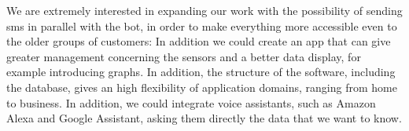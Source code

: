 We are extremely interested in expanding our work with the possibility of sending sms in parallel with the bot, in order to make everything more accessible even to the older groups of customers: In addition we could create an app that can give greater management concerning the sensors and a better data display, for example introducing graphs. In addition, the structure of the software, including the database, gives an high flexibility of application domains, ranging from home to business. In addition, we could integrate voice assistants, such as Amazon Alexa and Google Assistant, asking them directly the data that we want to know.